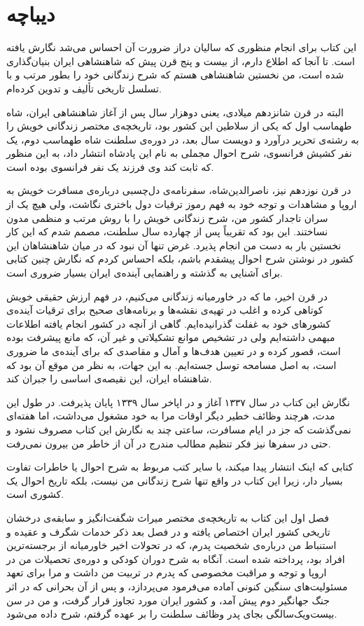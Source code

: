 \chapter{دیباچه}
این کتاب برای انجام منظوری که سالیان دراز ضرورت آن احساس می‌شد نگارش یافته است. تا آنجا که اطلاع دارم، از بیست و پنج قرن پیش که شاهنشاهی ایران بنیان‌گذاری شده است، من نخستین شاهنشاهی هستم که شرح زندگانی خود را بطور مرتب و با تسلسل تاریخی تألیف و تدوین کرده‌ام.
\par
البته در قرن شانزدهم میلادی، یعنی دوهزار سال پس از آغاز شاهنشاهی ایران، \gls{شاه طهماسب اول} که یکی از سلاطین این کشور بود، تاریخچه‌‌ی مختصر زندگانی خویش را به رشته‌ی تحریر درآورد و دویست سال بعد، در دوره‌ی سلطنت \gls{شاه طهماسب دوم}، یک نفر کشیش فرانسوی، شرح احوال مجملی به نام این پادشاه انتشار داد، به این منظور که ثابت کند وی فرزند یک نفر فرانسوی بوده است. 
\par
در قرن نوزدهم نیز، \gls{ناصرالدین‌شاه}، سفرنامه‌ی دل‌چسبی درباره‌ی مسافرت خویش به اروپا و مشاهدات و توجه خود به فهم رموز ترقیات دول باختری نگاشت، ولی هیچ یک از سران تاجدار کشور من، شرح زندگانی خویش را با روش مرتب و منظمی مدون نساختند. این بود که تقریباً پس از چهارده سال سلطنت، مصمم شدم که این کار نخستین بار به دست من انجام پذیرد. 
غرض تنها آن نبود که در میان شاهنشاهان این کشور در نوشتن شرح احوال پیشقدم باشم، بلکه احساس کردم که نگارش چنین کتابی برای آشنایی به گذشته و راهنمایی آینده‌ی ایران بسیار ضروری است.
\par
در قرن اخیر، ما که در خاورمیانه زندگانی می‌کنیم، در فهم ارزش حقیقی خویش کوتاهی کرده و اغلب در تهیه‌ی نقشه‌ها و برنامه‌های صحیح برای ترقیات آینده‌ی کشورهای خود به غفلت گذرانیده‌ایم. گاهی از آنچه در کشور انجام یافته اطلاعات مبهمی داشته‌ایم ولی در تشخیص موانع تشکیلاتی و غیر آن، که مانع پیشرفت بوده است، قصور کرده و در تعیین هدف‌ها و آمال و مقاصدی که برای آینده‌ی ما ضروری است، به اصل مسامحه توسل جسته‌ایم. به این جهات، به نظر من موقع آن بود که شاهنشاه ایران، این نقیصه‌ی اساسی را جبران کند. 
\par
نگارش این کتاب در سال ۱۳۳۷ آغاز و در اپاخر سال ۱۳۳۹ پایان پذیرفت. در طول این مدت، هرچند وظائف خطیر دیگر اوقات مرا به خود مشغول می‌داشت، اما هفته‌ای نمی‌گذشت که جز در ایام مسافرت، ساعتی چند به نگارش این کتاب مصروف نشود و حتی در سفرها نیز فکر تنظیم مطالب مندرج در آن از خاطر من بیرون نمی‌رفت. 
\par
	کتابی که اینک انتشار پیدا میکند، با سایر کتب مربوط به شرح احوال یا خاطرات تفاوت بسیار دار، زیرا این کتاب در واقع تنها شرح زندگانی من نیست، بلکه تاریخ احوال یک کشوری است. 
\par
	فصل اول این کتاب به تاریخچه‌ی مختصر میراث شگفت‌انگیز و سابقه‌ی درخشان تاریخی کشور ایران اختصاص یافته و در فصل بعد ذکر خدمات شگرف و عقیده و استنباط من درباره‌ی شخصیت پدرم، که در تحولات اخیر خاورمیانه از برجسته‌ترین افراد بود، پرداخته شده است. آنگاه به شرح دوران کودکی و دوره‌ی تحصیلات من در اروپا و توجه و مراقبت مخصوصی که پدرم در تربیت من داشت و مرا برای تعهد مسئولیت‌های سنگین کنونی آماده می‌فرمود می‌پردازد، و پس از آن بحرانی که در اثر جنگ جهانگیر دوم پیش آمد، و کشور ایران مورد تجاوز قرار گرفت، و من در سن بیست‌و‌یک‌سالگی بجای پدر وظائف سلطنت را بر عهده گرفتم، شرح داده می‌شود.
